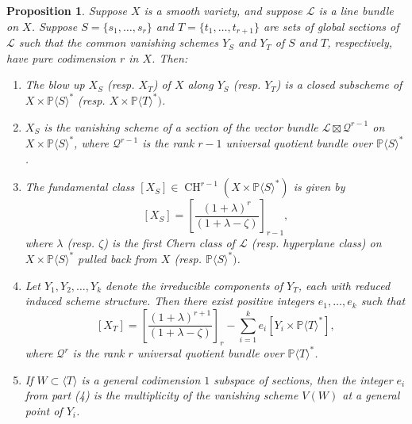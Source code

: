 \documentclass[12pt]{article}
\theoremstyle{plain}
\newtheorem{proposition}[theorem]{Proposition}
\theoremstyle{remark}
\renewcommand{\P}{\mathbb{P}}
\newcommand{\CH}{\operatorname{CH}}
\renewcommand{\L}{\mathscr{L}}
\newcommand{\QQ}{\mathscr{Q}}
\begin{document}
    \begin{proposition}
        \label{proposition:resolution}
        Suppose $X$ is a smooth variety, and suppose $\L$ is a line bundle on $X$. Suppose $S = \{s_1, \dots, s_r\}$ and $T = \{t_1, \dots, t_{r+1}\}$ are sets of global sections of $\L$ such that the common vanishing schemes $Y_S$ and $Y_T$ of $S$ and $T$, respectively, have pure codimension $r$ in $X$.
        Then:
        \begin{enumerate}
            \item The blow up $X_{S}$ (resp. $X_{T}$) of $X$ along $Y_S$ (resp. $Y_T$) is a closed subscheme of $X \times \P \langle S \rangle^{*}$ (resp. $X \times \P \langle T \rangle^{*})$.
            \item $X_{S}$ is the vanishing scheme of a section of the vector bundle $\L \boxtimes \QQ^{r-1}$ on $X \times \P \langle S \rangle^{*}$, where $\QQ^{r-1}$ is the rank $r-1$ universal quotient bundle over $\P \langle S \rangle^{*}$.
            \item The fundamental class $[X_{S}] \in \CH^{r-1}(X \times \P \langle S \rangle^{*})$ is given by
            \[
                [X_{S}] = \left[\frac{(1+\lambda)^{r}}{(1 + \lambda - \zeta)}\right]_{r-1},
            \]
            where $\lambda$ (resp. $\zeta$) is the first Chern class of $\L$ (resp. hyperplane class) on  $X \times \P \langle S \rangle^{*}$ pulled back  from $X$ (resp. $\P \langle S \rangle^{*})$.
            \item Let $Y_1, Y_2, \dots, Y_{k}$ denote the irreducible components of $Y_T$, each with reduced induced scheme structure.  Then there exist positive integers $e_1, \dots, e_k$ such that
            \[
                [X_{T}] = \left[\frac{(1+\lambda)^{r+1}}{(1 + \lambda - \zeta)}\right]_{r} - \sum_{i=1}^{k} e_i [Y_{i} \times \P \langle T \rangle^{*}],
            \]
            where $\QQ^{r}$ is the rank $r$ universal quotient bundle over $\P \langle T \rangle^{*}$.
            \item If $W \subset \langle T \rangle$ is a general codimension $1$ subspace of sections, then the integer $e_i$ from part (4) is the multiplicity of the vanishing scheme $V(W)$ at a general point of $Y_i$.
        \end{enumerate}
    \end{proposition}
\end{document}

